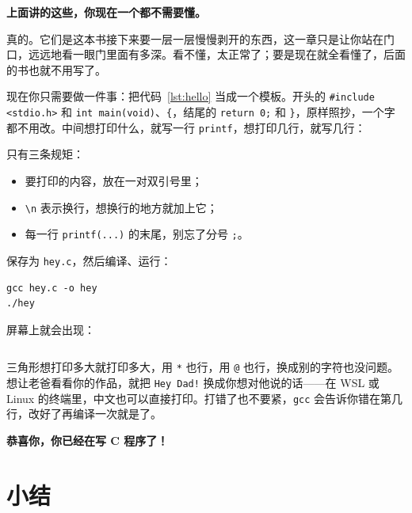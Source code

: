 \begin{center}
  {\Large\bfseries 上面讲的这些，你现在一个都不需要懂。}
\end{center}

真的。它们是这本书接下来要一层一层慢慢剥开的东西，这一章只是让你站在门口，远远地看一眼门里面有多深。看不懂，太正常了；要是现在就全看懂了，后面的书也就不用写了。

现在你只需要做一件事：把代码~\ref{lst:hello} 当成一个模板。开头的 \texttt{\#include <stdio.h>} 和 \texttt{int main(void)}、\texttt{\{}，结尾的 \texttt{return 0;} 和 \texttt{\}}，原样照抄，一个字都不用改。中间想打印什么，就写一行 \texttt{printf}，想打印几行，就写几行：


只有三条规矩：
\begin{itemize}
  \item 要打印的内容，放在一对双引号里；
  \item \texttt{\textbackslash n} 表示换行，想换行的地方就加上它；
  \item 每一行 \texttt{printf(...)} 的末尾，别忘了分号 \texttt{;}。
\end{itemize}

保存为 \texttt{hey.c}，然后编译、运行：
\begin{verbatim}
gcc hey.c -o hey
./hey
\end{verbatim}
屏幕上就会出现：
\inputminted[linenos=false]{text}{code/ch01/hey.out}

三角形想打印多大就打印多大，用 \texttt{*} 也行，用 \texttt{@} 也行，换成别的字符也没问题。想让老爸看看你的作品，就把 \texttt{Hey Dad!} 换成你想对他说的话——在 WSL 或 Linux 的终端里，中文也可以直接打印。打错了也不要紧，\texttt{gcc} 会告诉你错在第几行，改好了再编译一次就是了。

\bigskip
\begin{center}
  {\Large\bfseries 恭喜你，你已经在写 C 程序了！}
\end{center}
\bigskip

\section{小结}

